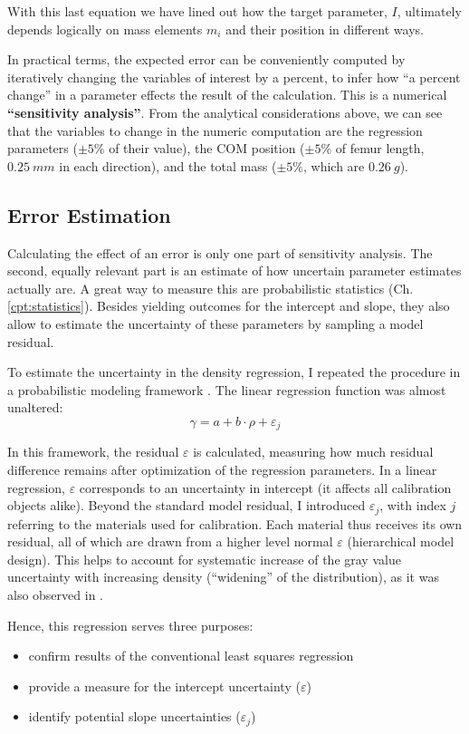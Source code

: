 With this last equation we have lined out how the target parameter, \(I\), ultimately depends logically on mass elements \(m_{i}\) and their position in different ways.


In practical terms, the expected error can be conveniently computed by iteratively changing the variables of interest by a percent, to infer how ``a percent change'' in a parameter effects the result of the calculation.
This is a numerical \textbf{``sensitivity analysis''}.
From the analytical considerations above, we can see that the variables to change in the numeric computation are the regression parameters (\(\pm 5 \%\) of their value), the COM position (\(\pm 5 \%\) of femur length, \(0.25\ mm\) in each direction), and the total mass (\(\pm 5 \%\), which are \(0.26\ g\)).


\subsection{Error Estimation}
\label{sec:orgc5682b5}
Calculating the effect of an error is only one part of sensitivity analysis.
The second, equally relevant part is an estimate of how uncertain parameter estimates actually are.
A great way to measure this are probabilistic statistics (Ch. \ref{cpt:statistics}).
Besides yielding outcomes for the intercept and slope, they also allow to estimate the uncertainty of these parameters by sampling a model residual.


To estimate the uncertainty in the density regression, I repeated the procedure in a probabilistic modeling framework \citep[PyMC, Version 5.6,][]{Salvatier2016}.
The linear regression function was almost unaltered:
\[\gamma = a+b\cdot\rho + \varepsilon_{j}\]


In this framework, the residual \(\varepsilon\) is calculated, measuring how much residual difference remains after optimization of the regression parameters.
In a linear regression, \(\varepsilon\) corresponds to an uncertainty in intercept (it affects all calibration objects alike).
Beyond the standard model residual, I introduced \(\varepsilon_{j}\), with index \(j\) referring to the materials used for calibration.
Each material thus receives its own residual, all of which are drawn from a higher level normal \(\varepsilon\) (hierarchical model design).
This helps to account for systematic increase of the gray value uncertainty with increasing density (``widening'' of the distribution), as it was also observed in \citet{DuPlessis2013}.

Hence, this regression serves three purposes:
\begin{itemize}
\item confirm results of the conventional least squares regression
\item provide a measure for the intercept uncertainty (\(\varepsilon\))
\item identify potential slope uncertainties (\(\varepsilon_{j}\))
\end{itemize}


